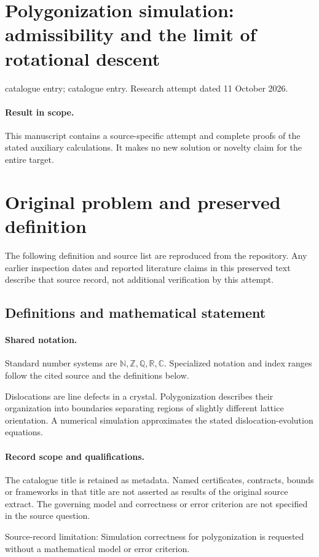 \documentclass[11pt]{article}
\begin{document}
\section*{Polygonization simulation: admissibility and the limit of rotational descent}
\noindent catalogue entry; catalogue entry. Research attempt dated 11 October 2026.
\paragraph{Result in scope.}This manuscript contains a source-specific attempt and complete proofs of the stated auxiliary calculations. It makes no new solution or novelty claim for the entire target.
\section{Original problem and preserved definition}
The following definition and source list are reproduced from the repository. Any earlier inspection dates and reported literature claims in this preserved text describe that source record, not additional verification by this attempt.
\subsection{Definitions and mathematical statement}

\paragraph{Shared notation.}Standard number systems are $\mathbb N,\mathbb Z,\mathbb Q,\mathbb R,\mathbb C$. Specialized notation and index ranges follow the cited source and the definitions below.


Dislocations are line defects in a crystal. Polygonization describes their organization into boundaries separating regions of slightly different lattice orientation. A numerical simulation approximates the stated dislocation-evolution equations.
\paragraph{Record scope and qualifications.}
The catalogue title is retained as metadata. Named certificates, contracts, bounds or frameworks in that title are not asserted as results of the original source extract.
The governing model and correctness or error criterion are not specified in the source question.

Source-record limitation: Simulation correctness for polygonization is requested without a mathematical model or error criterion.
\end{document}
